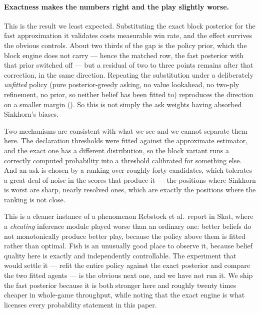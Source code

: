 \paragraph{Exactness makes the numbers right and the play slightly worse.} This
is the result we least expected. Substituting the exact block posterior for the
fast approximation it validates costs measurable win rate, and the effect
survives the obvious controls. About two thirds of the gap is the policy prior,
which the block engine does not carry --- hence the matched row, the fast
posterior with that prior switched off --- but a residual of two to three points
remains after that correction, in the same direction. Repeating the substitution
under a deliberately \emph{unfitted} policy (pure posterior-greedy asking, no
value lookahead, no two-ply refinement, no prior, so neither belief has been
fitted to) reproduces the direction on a smaller margin
(). So this is not simply the ask
weights having absorbed Sinkhorn's biases.

Two mechanisms are consistent with what we see and we cannot separate them here.
The declaration thresholds were fitted against the approximate estimator, and the
exact one has a different distribution, so the block variant runs a correctly
computed probability into a threshold calibrated for something else. And an ask
is chosen by a ranking over roughly forty candidates, which tolerates a great
deal of noise in the scores that produce it --- the positions where Sinkhorn is
worst are sharp, nearly resolved ones, which are exactly the positions where the
ranking is not close.

This is a cleaner instance of a phenomenon Rebstock et al.\ report in Skat, where
a \emph{cheating} inference module played worse than an ordinary one: better
beliefs do not monotonically produce better play, because the policy above them
is fitted rather than optimal. Fish is an unusually good place to observe it,
because belief quality here is exactly and independently controllable. The
experiment that would settle it --- refit the entire policy against the exact
posterior and compare the two fitted agents --- is the obvious next one, and we
have not run it. We ship the fast posterior because it is both stronger here and
roughly twenty times cheaper in whole-game throughput, while noting that the
exact engine is what licenses every probability statement in this paper.
